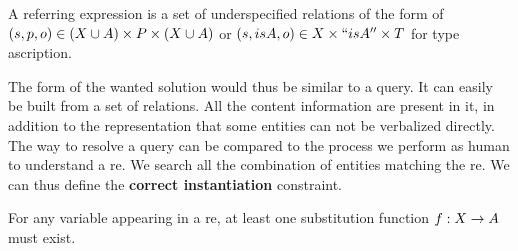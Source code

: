 \begin{definition}
A referring expression is a set of underspecified relations of the form of $(s, p, o) \in (X \cup A) \times P \times (X \cup A)$ or $(s, isA, o) \in X \times ``isA'' \times T$ for type ascription.
\end{definition}

The form of the wanted solution would thus be similar to a \sparql{} query. It can easily be built from a set of relations. All the content information are present in it, in addition to the representation that some entities can not be verbalized directly. The way to resolve a \sparql{} query can be compared to the process we perform as human to understand a \acrshort{re}. We search all the combination of entities matching the \acrshort{re}. We can thus define the \textbf{correct instantiation} constraint.

\begin{theorem} 
\label{the:correct_intance}
For any variable appearing in a \acrshort{re}, at least one substitution function $f: X \rightarrow A$ must exist.
\end{theorem}


